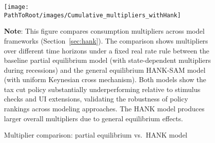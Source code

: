 \documentclass[\PathToRoot/\ProjectName]{subfiles}
\begin{document}
\begin{figure}[htb] 
  \centering
  \caption{Multiplier comparison: partial equilibrium vs.\ HANK model}
  \whenintegrated{\label{fig:HANK_multipliers}} 
  \texttt{[image: \\PathToRoot/images/Cumulative\_multipliers\_withHank]}

  \medskip
  \noindent\parbox{\textwidth}{\footnotesize
    \textbf{Note}: This figure compares consumption multipliers across model frameworks (Section~\ref{sec:hank}).
    The comparison shows multipliers over different time horizons under a fixed real rate rule
    between the baseline partial equilibrium model (with state-dependent multipliers during recessions)
    and the general equilibrium HANK-SAM model (with uniform Keynesian cross mechanism).
    Both models show the tax cut policy substantially underperforming relative to stimulus checks
    and UI extensions, validating the robustness of policy rankings across modeling approaches.
    The HANK model produces larger overall multipliers due to general equilibrium effects.
  }
\end{figure}

\vspace{0.5em}

\smartbib
\end{document}
